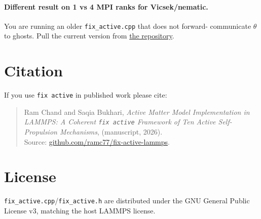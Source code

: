 \documentclass[11pt,a4paper]{article}
\begin{document}
\paragraph{Different result on 1 vs 4 MPI ranks for Vicsek/nematic.}
You are running an older \texttt{fix\_active.cpp} that does not forward-
communicate $\theta$ to ghosts.  Pull the current version from
\href{https://github.com/ramc77/fix-active-lammps}{the repository}.

\section{Citation}

If you use \texttt{fix active} in published work please cite:
\begin{quote}\small
Ram Chand and Saqia Bukhari, \emph{Active Matter Model Implementation in LAMMPS: A Coherent \texttt{fix active} Framework of Ten Active Self-Propulsion Mechanisms}, (manuscript, 2026).\\
Source: \href{https://github.com/ramc77/fix-active-lammps}{github.com/ramc77/fix-active-lammps}.
\end{quote}

\section{License}

\texttt{fix\_active.cpp}/\texttt{fix\_active.h} are distributed under the
GNU General Public License v3, matching the host LAMMPS license.
\end{document}
